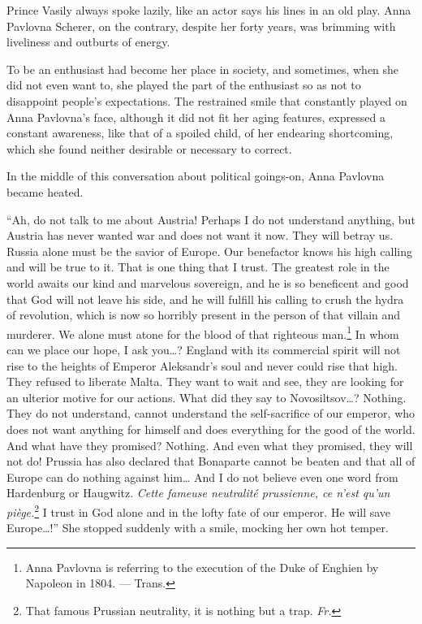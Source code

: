 Prince Vasily always spoke lazily, like an actor says his lines in an old play. Anna Pavlovna Scherer, on the contrary, despite her forty years, was brimming with liveliness and outburts of energy.

To be an enthusiast had become her place in society, and sometimes, when she did not even want to, she played the part of the enthusiast so as not to disappoint people's expectations. The restrained smile that constantly played on Anna Pavlovna's face, although it did not fit her aging features, expressed a constant awareness, like that of a spoiled child, of her endearing shortcoming, which she found neither desirable or necessary to correct.

In the middle of this conversation about political goings-on, Anna Pavlovna became heated.

``Ah, do not talk to me about Austria! Perhaps I do not understand anything, but Austria has never wanted war and does not want it now. They will betray us. Russia alone must be the savior of Europe. Our benefactor knows his high calling and will be true to it. That is one thing that I trust. The greatest role in the world awaits our kind and marvelous sovereign, and he is so beneficent and good that God will not leave his side, and he will fulfill his calling to crush the hydra of revolution, which is now so horribly present in the person of that villain and murderer. We alone must atone for the blood of that righteous man.\footnote{Anna Pavlovna is referring to the execution of the Duke of Enghien by Napoleon in 1804. --- Trans.} In whom can we place our hope, I ask you\ldots{}? England with its commercial spirit will not rise to the heights of Emperor Aleksandr's soul and never could rise that high. They refused to liberate Malta. They want to wait and see, they are looking for an ulterior motive for our actions. What did they say to Novosiltsov\ldots{}? Nothing. They do not understand, cannot understand the self-sacrifice of our emperor, who does not want anything for himself and does everything for the good of the world. And what have they promised? Nothing. And even what they promised, they will not do! Prussia has also declared that Bonaparte cannot be beaten and that all of Europe can do nothing against him\ldots{} And I do not believe even one word from Hardenburg or Haugwitz. \textit{Cette fameuse neutralit\'e prussienne, ce n'est qu'un pi\`ege.}\footnote{That famous Prussian neutrality, it is nothing but a trap. \textit{Fr.}} I trust in God alone and in the lofty fate of our emperor. He will save Europe\ldots{}!'' She stopped suddenly with a smile, mocking her own hot temper. %

